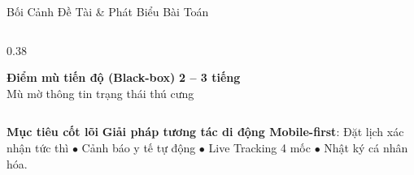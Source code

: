 \begin{frame}{Bối Cảnh Đề Tài \& Phát Biểu Bài Toán}
\begin{columns}[T]
\begin{column}{0.38\textwidth}
      \vspace{-1.5mm}
      \begin{alertblock}{\centering \scriptsize \textbf{Điểm mù tiến độ (Black-box)}}
        \centering \vspace{0.2mm}
        {\large \textbf{2 -- 3 tiếng}}\\[0.2mm]
        {\tiny \color{PetcareDark}Mù mờ thông tin trạng thái thú cưng}
      \end{alertblock}
    \end{column}
  \end{columns}

  \vspace{0.2mm}
  \begin{block}{\scriptsize \textbf{Mục tiêu cốt lõi}}
    \tiny \textbf{Giải pháp tương tác di động Mobile-first}: Đặt lịch xác nhận tức thì $\bullet$ Cảnh báo y tế tự động $\bullet$ Live Tracking 4 mốc $\bullet$ Nhật ký cá nhân hóa.
  \end{block}
\end{frame}
